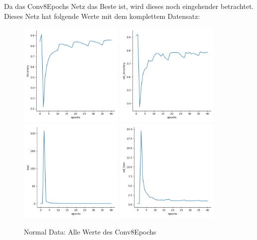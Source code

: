     Da das Conv8Epochs Netz das Beste ist, wird dieses noch eingehender betrachtet. 
    Dieses Netz hat folgende Werte mit dem komplettem Datensatz: 
    \begin{figure}[htpb]
        \includegraphics[height=5cm]{../Plots/models_03_C8E/Accuracy.png}
        \includegraphics[height=5cm]{../Plots/models_03_C8E/val_Accuracy.png}
        \includegraphics[height=5cm]{../Plots/models_03_C8E/loss.png}
        \includegraphics[height=5cm]{../Plots/models_03_C8E/val_loss.png}
        \caption{\label{fig:figure10} Normal Data: Alle Werte des Conv8Epochs}
    \end{figure}

